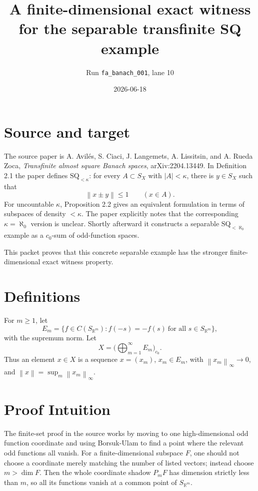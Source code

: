 \documentclass[11pt]{article}
\title{A finite-dimensional exact witness for the separable transfinite SQ example}
\author{Run \texttt{fa\_banach\_001}, lane 10}
\date{2026-06-18}
\newcommand{\R}{\mathbb{R}}
\newcommand{\norm}[1]{\left\lVert #1 \right\rVert}
\begin{document}
\maketitle

\section*{Source and target}

The source paper is A. Avilés, S. Ciaci, J. Langemets, A. Lissitsin, and
A. Rueda Zoca, \emph{Transfinite almost square Banach spaces},
arXiv:2204.13449.  In Definition 2.1 the paper defines
\(\mathrm{SQ}_{<\kappa}\): for every \(A\subset S_X\) with \(|A|<\kappa\),
there is \(y\in S_X\) such that
\[
  \norm{x\pm y}\leq 1 \qquad (x\in A).
\]
For uncountable \(\kappa\), Proposition 2.2 gives an equivalent formulation in
terms of subspaces of density \(<\kappa\).  The paper explicitly notes that the
corresponding \(\kappa=\aleph_0\) version is unclear.  Shortly afterward it
constructs a separable \(\mathrm{SQ}_{<\aleph_0}\) example as a \(c_0\)-sum of
odd-function spaces.

This packet proves that this concrete separable example has the stronger
finite-dimensional exact witness property.

\section*{Definitions}

For \(m\geq 1\), let
\[
 E_m=\{f\in C(S_{\R^m}) : f(-s)=-f(s)\ \text{for all }s\in S_{\R^m}\},
\]
with the supremum norm.  Let
\[
 X=\Big(\bigoplus_{m=1}^{\infty} E_m\Big)_{c_0}.
\]
Thus an element \(x\in X\) is a sequence \(x=(x_m)\), \(x_m\in E_m\),
with \(\norm{x_m}_\infty\to 0\), and
\(\norm{x}=\sup_m \norm{x_m}_\infty\).

\section*{Proof Intuition}

The finite-set proof in the source works by moving to one high-dimensional odd
function coordinate and using Borsuk-Ulam to find a point where the relevant
odd functions all vanish.  For a finite-dimensional subspace \(F\), one should
not choose a coordinate merely matching the number of listed vectors; instead
choose \(m>\dim F\).  Then the whole coordinate shadow \(P_mF\) has dimension
strictly less than \(m\), so all its functions vanish at a common point of
\(S_{\R^m}\).
\end{document}
